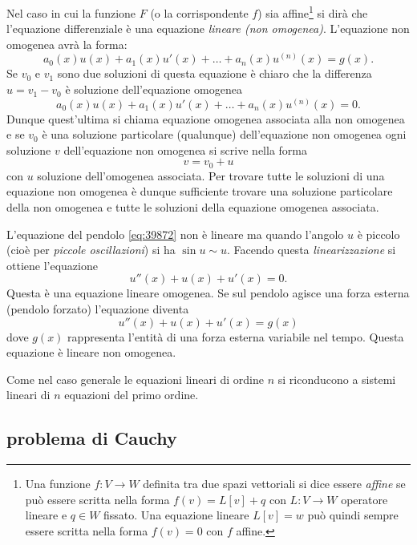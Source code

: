 Nel caso in cui la funzione $F$ (o la corrispondente $f$)
sia affine\footnote{%
Una funzione $f\colon V\to W$ definita tra due spazi vettoriali si dice 
essere \emph{affine} se può essere scritta nella forma $f(v)=L[v] + q$
con $L\colon V\to W$ operatore lineare e $q\in W$ fissato.
Una equazione lineare $L[v]=w$ può quindi sempre essere scritta nella forma 
$f(v)=0$ con $f$ affine.
} 
si dirà che l'equazione differenziale
è una equazione
%
%
\emph{lineare (non omogenea)}.
L'equazione non omogenea avrà la forma:
\[
  a_0(x) u(x) + a_1(x) u'(x) + \dots + a_n(x) u^{(n)}(x) = g(x).
\]
Se $v_0$ e $v_1$ sono due soluzioni di questa equazione è chiaro che la
differenza $u=v_1 - v_0$ è soluzione dell'equazione omogenea
\[
  a_0(x) u(x) + a_1(x) u'(x) + \dots + a_n(x) u^{(n)}(x) = 0.
\]
Dunque quest'ultima si chiama equazione omogenea associata alla non omogenea
e se $v_0$ è una soluzione particolare (qualunque) dell'equazione non omogenea
ogni soluzione $v$ dell'equazione non omogenea si scrive nella forma
\[
  v = v_0 + u
\]
con $u$ soluzione dell'omogenea associata.
Per trovare tutte le soluzioni di una equazione non omogenea è dunque
sufficiente trovare una soluzione particolare della non omogenea 
e tutte le soluzioni della equazione omogenea associata.

L'equazione del pendolo \eqref{eq:39872} non è lineare
ma quando l'angolo $u$ è piccolo (cioè per \emph{piccole oscillazioni}) si ha $\sin u \sim u$.
Facendo questa \emph{linearizzazione} si ottiene l'equazione
\[
  u''(x)  + u(x) + u'(x) = 0.
\]
Questa è una equazione lineare omogenea.
Se sul pendolo agisce una forza esterna (pendolo forzato) l'equazione diventa
\[
  u''(x) + u(x) + u'(x) = g(x)
\]
dove $g(x)$ rappresenta l'entità di una forza esterna variabile nel tempo.
Questa equazione è lineare non omogenea.

Come nel caso generale le equazioni lineari di ordine $n$ si riconducono
a sistemi lineari di $n$ equazioni del primo ordine.

\subsection{problema di Cauchy}

